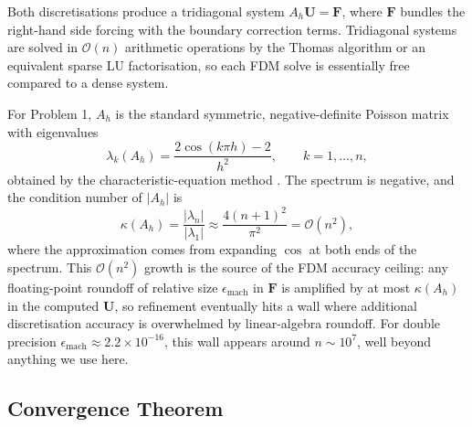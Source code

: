\documentclass[11pt]{article}
\theoremstyle{plain}
\theoremstyle{remark}
\newcommand{\Ah}{A_h}
\newcommand{\bigO}{\mathcal{O}}
\begin{document}
Both discretisations produce a tridiagonal system $\Ah \mathbf{U} = \mathbf{F}$,
where $\mathbf{F}$ bundles the right-hand side forcing with the boundary
correction terms. Tridiagonal systems are solved in $\bigO(n)$ arithmetic
operations by the Thomas algorithm or an equivalent sparse LU factorisation,
so each FDM solve is essentially free compared to a dense system.

For Problem 1, $\Ah$ is the standard symmetric, negative-definite Poisson
matrix with eigenvalues
\begin{equation}
\lambda_k(\Ah) = \frac{2 \cos(k \pi h) - 2}{h^2}, \qquad k = 1, \dots, n,
\label{eq:eigs}
\end{equation}
obtained by the characteristic-equation method \citep{khouider2026bvp}.
The spectrum is negative, and the condition number of $|\Ah|$ is
\begin{equation}
\kappa(\Ah) = \frac{|\lambda_n|}{|\lambda_1|} \approx \frac{4(n+1)^2}{\pi^2}
  = \bigO(n^2),
\label{eq:cond}
\end{equation}
where the approximation comes from expanding $\cos$ at both ends of the
spectrum. This $\bigO(n^2)$ growth is the source of the FDM accuracy
ceiling: any floating-point roundoff of relative size $\epsilon_{\text{mach}}$
in $\mathbf{F}$ is amplified by at most $\kappa(\Ah)$ in the computed
$\mathbf{U}$, so refinement eventually hits a wall where additional
discretisation accuracy is overwhelmed by linear-algebra roundoff. For
double precision $\epsilon_{\text{mach}} \approx 2.2 \times 10^{-16}$, this
wall appears around $n \sim 10^7$, well beyond anything we use here.


\subsection{Convergence Theorem}
\label{sec:conv}
\end{document}

